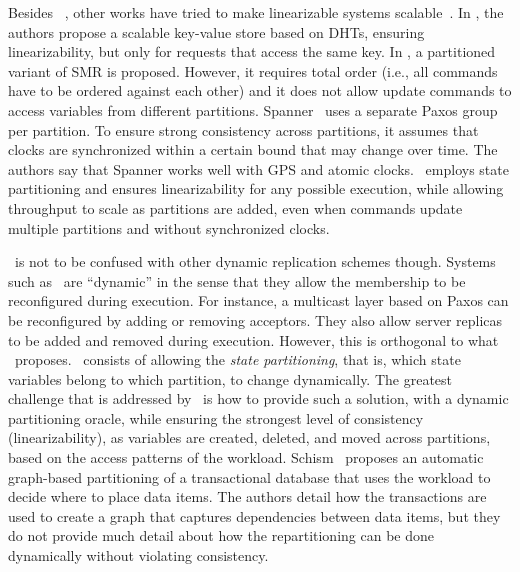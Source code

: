 Besides \ssmr{}~\cite{bezerra2014ssmr}, other works have tried to make linearizable systems scalable~\cite{corbett2013spanner, Glendenning2011, Marandi11}.
In \cite{Glendenning2011}, the authors propose a scalable key-value store based on DHTs, ensuring linearizability, but only for requests that access the same key. 
In \cite{Marandi11}, a partitioned variant of SMR is proposed.
However, it requires total order (i.e., all commands have to be ordered against each other) and it does not allow update commands to access variables from different partitions.
Spanner~\cite{corbett2013spanner} uses a separate Paxos group per partition.
To ensure strong consistency across partitions, it assumes that clocks are synchronized within a certain bound that may change over time.
The authors say that Spanner works well with GPS and atomic clocks.
\dssmrlong\ employs state partitioning and ensures linearizability for any possible execution, while allowing throughput to scale as partitions are added, even when commands update multiple partitions and without synchronized clocks.


\dssmr\ is not to be confused with other dynamic replication schemes though. Systems such as~\cite{birman2010dsr,guessoum2003dar,dustdar2007soc} are ``dynamic'' in the sense that they allow the membership to be reconfigured during execution. For instance, a multicast layer based on Paxos can be reconfigured by adding or removing acceptors. They also allow server replicas to be added and removed during execution.
However, this is orthogonal to what \dssmr\ proposes.
\dssmrlong\ consists of allowing the \emph{state partitioning}, that is, which state variables belong to which partition, to change dynamically.
The greatest challenge that is addressed by \dssmr\ is how to provide such a solution, with a dynamic partitioning oracle, while ensuring the strongest level of consistency (linearizability), as variables are created, deleted, and moved across partitions, based on the access patterns of the workload.
Schism~\cite{curino2010sch} proposes an automatic graph-based partitioning of a transactional database that uses the workload to decide where to place data items.
The authors detail how the transactions are used to create a graph that captures dependencies between data items, but they do not provide much detail about how the repartitioning can be done dynamically without violating consistency.

